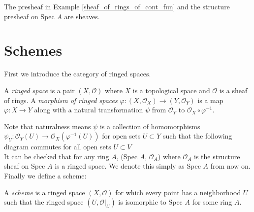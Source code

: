 \documentclass[ag.tex]{subfiles}
\begin{document}
\begin{exmp}
The presheaf in Example \ref{sheaf_of_rings_of_cont_fun} and the structure presheaf on Spec $A$ are sheaves.
\end{exmp}

\section{Schemes}

First we introduce the category of ringed spaces.

\begin{definition}
A \textit{ringed space} is a pair $(X, \mathcal{O})$ where $X$ is a topological space and $\mathcal{O}$ is a sheaf of rings. A \textit{morphism of ringed spaces} $\varphi: (X, \mathcal{O}_X) \to (Y, \mathcal{O}_Y)$ is a map $\varphi: X \to Y$ along with a natural transformation $\psi$ from $\mathcal{O}_Y$ to $\mathcal{O}_X \circ \varphi^{-1}$.
\end{definition}

Note that naturalness means $\psi$ is a collection of homomorphisms $\psi_U: \mathcal{O}_Y (U) \to \mathcal{O}_X (\varphi^{-1}(U))$ for open sets $U \subset Y$ such that the following diagram commutes for all open sets $U \subset V$ \\

It can be checked that for any ring $A$, (Spec $A$,  $\mathcal{O}_A$) where $\mathcal{O}_A$ is the structure sheaf on Spec $A$ is a ringed space.  We denote this simply as Spec $A$ from now on. Finally we define a scheme:

\begin{definition}
A \textit{scheme} is a ringed space $(X, \mathcal{O})$ for which every point has a neighborhood $U$ such that the ringed space $(U, \mathcal{O}|_{U})$ is isomorphic to Spec $A$ for some ring $A$. 
\end{definition}
\end{document}
